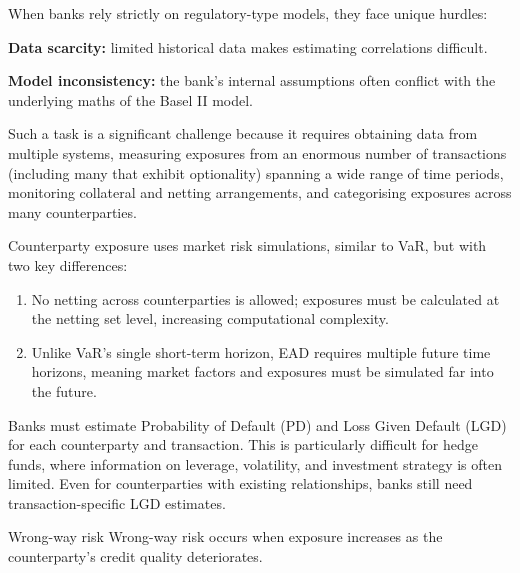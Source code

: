 When banks rely strictly on regulatory-type models, they face unique hurdles:

\begin{checks}
\item \textbf{Data scarcity:} limited historical data makes estimating
correlations difficult.
\item \textbf{Model inconsistency:} the bank's internal assumptions often conflict
with the underlying maths of the Basel II model.
\end{checks}


Such a task is a significant challenge because it requires obtaining data from
multiple systems, measuring exposures from an enormous number of transactions
(including many that exhibit optionality) spanning a wide range of time periods,
monitoring collateral and netting arrangements, and categorising exposures across
many counterparties.


Counterparty exposure uses market risk simulations, similar to VaR, but with two
key differences:

\begin{enumerate}
\item[\textcolor{rust}{\sffamily\bfseries 1)}] No netting across counterparties is
allowed; exposures must be calculated at the netting set level, increasing
computational complexity.
\item[\textcolor{rust}{\sffamily\bfseries 2)}] Unlike VaR's single short-term
horizon, EAD requires multiple future time horizons, meaning market factors and
exposures must be simulated far into the future.
\end{enumerate}


Banks must estimate Probability of Default (PD) and Loss Given Default (LGD) for
each counterparty and transaction. This is particularly difficult for hedge funds,
where information on leverage, volatility, and investment strategy is often
limited. Even for counterparties with existing relationships, banks still need
transaction-specific LGD estimates.


\begin{ordefbox}{Wrong-way risk}
Wrong-way risk occurs when exposure increases as the counterparty's credit quality
deteriorates.
\end{ordefbox}

